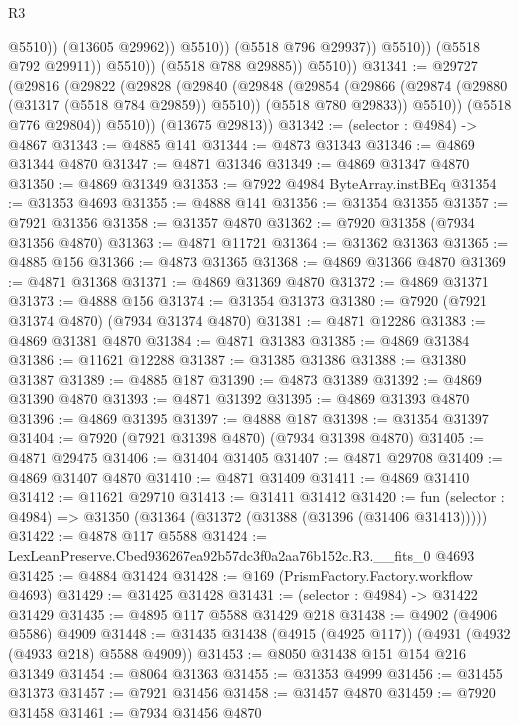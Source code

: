 \begin{lexlean}{R3}
\begin{coremodule}
                                @5510))
                            (@13605 @29962))
                          @5510))
                      (@5518 @796 @29937))
                    @5510))
                (@5518 @792 @29911))
              @5510))
          (@5518 @788 @29885))
        @5510))
@31341 := @29727
    (@29816
      (@29822
        (@29828
          (@29840
            (@29848
              (@29854
                (@29866 (@29874 (@29880 (@31317 (@5518 @784 @29859)) @5510)) (@5518 @780 @29833))
                @5510))
            (@5518 @776 @29804))
          @5510))
      (@13675 @29813))
@31342 := (selector : @4984) -> @4867
@31343 := @4885 @141
@31344 := @4873 @31343
@31346 := @4869 @31344 @4870
@31347 := @4871 @31346
@31349 := @4869 @31347 @4870
@31350 := @4869 @31349
@31353 := @7922 @4984 ByteArray.instBEq
@31354 := @31353 @4693
@31355 := @4888 @141
@31356 := @31354 @31355
@31357 := @7921 @31356
@31358 := @31357 @4870
@31362 := @7920 @31358 (@7934 @31356 @4870)
@31363 := @4871 @11721
@31364 := @31362 @31363
@31365 := @4885 @156
@31366 := @4873 @31365
@31368 := @4869 @31366 @4870
@31369 := @4871 @31368
@31371 := @4869 @31369 @4870
@31372 := @4869 @31371
@31373 := @4888 @156
@31374 := @31354 @31373
@31380 := @7920 (@7921 @31374 @4870) (@7934 @31374 @4870)
@31381 := @4871 @12286
@31383 := @4869 @31381 @4870
@31384 := @4871 @31383
@31385 := @4869 @31384
@31386 := @11621 @12288
@31387 := @31385 @31386
@31388 := @31380 @31387
@31389 := @4885 @187
@31390 := @4873 @31389
@31392 := @4869 @31390 @4870
@31393 := @4871 @31392
@31395 := @4869 @31393 @4870
@31396 := @4869 @31395
@31397 := @4888 @187
@31398 := @31354 @31397
@31404 := @7920 (@7921 @31398 @4870) (@7934 @31398 @4870)
@31405 := @4871 @29475
@31406 := @31404 @31405
@31407 := @4871 @29708
@31409 := @4869 @31407 @4870
@31410 := @4871 @31409
@31411 := @4869 @31410
@31412 := @11621 @29710
@31413 := @31411 @31412
@31420 := fun (selector : @4984) => @31350 (@31364 (@31372 (@31388 (@31396 (@31406 @31413)))))
@31422 := @4878 @117 @5588
@31424 := LexLeanPreserve.Cbed936267ea92b57dc3f0a2aa76b152c.R3.__fits_0 @4693
@31425 := @4884 @31424
@31428 := @169 (PrismFactory.Factory.workflow @4693)
@31429 := @31425 @31428
@31431 := (selector : @4984) -> @31422 @31429
@31435 := @4895 @117 @5588 @31429 @218
@31438 := @4902 (@4906 @5586) @4909
@31448 := @31435 @31438 (@4915 (@4925 @117)) (@4931 (@4932 (@4933 @218) @5588 @4909))
@31453 := @8050 @31438 @151 @154 @216 @31349
@31454 := @8064 @31363
@31455 := @31353 @4999
@31456 := @31455 @31373
@31457 := @7921 @31456
@31458 := @31457 @4870
@31459 := @7920 @31458
@31461 := @7934 @31456 @4870

\end{coremodule}
\end{lexlean}
